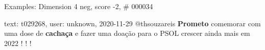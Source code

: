 \begin{frame}{Examples: Dimension 4 neg, score -2, \# 000034}
\footnotesize
\begin{alertblock}{text: t029268, user: unknown, 2020-11-29}
@thsouzareis \textbf{Prometo} comemorar com uma dose de \textbf{cachaça} e 
fazer uma doação para o PSOL crescer ainda mais em 2022 ! ! ! 
\end{alertblock}
\end{frame}
